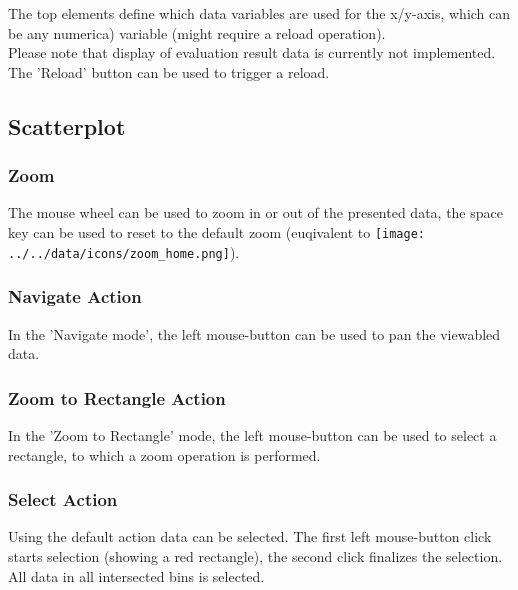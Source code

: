 The top elements define which data variables are used for the x/y-axis, which can be any numerica) variable (might require a reload operation). \\

Please note that display of evaluation result data is currently not implemented. \\

The 'Reload' button can be used to trigger a reload.

\subsection{Scatterplot}

\subsubsection{Zoom}

The mouse wheel can be used to zoom in or out of the presented data, the space key can be used to reset to the default zoom (euqivalent to \texttt{[image: ../../data/icons/zoom\_home.png]}).

\subsubsection{Navigate Action}

In the 'Navigate mode', the left mouse-button can be used to pan the viewabled data.

\subsubsection{Zoom to Rectangle Action}

In the 'Zoom to Rectangle' mode, the left mouse-button can be used to select a rectangle, to which a zoom operation is performed.

\subsubsection{Select Action}

Using the default action data can be selected. The first left mouse-button click starts selection (showing a red rectangle), the second click finalizes the selection. All data in all intersected bins is selected.

